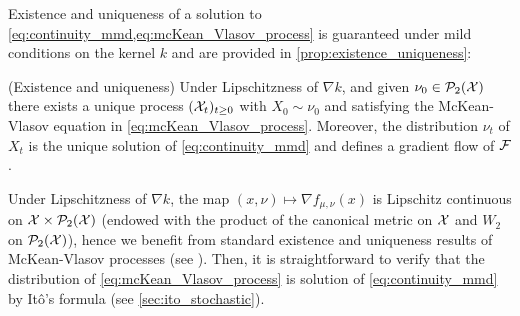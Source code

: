 Existence and uniqueness of a solution to \cref{eq:continuity_mmd,eq:mcKean_Vlasov_process} is guaranteed under mild conditions on the kernel $k$ and are provided in \cref{prop:existence_uniqueness}:
\begin{proposition}\label{prop:existence_uniqueness}(Existence and uniqueness)
	Under Lipschitzness of $\nabla k$, and given $\nu_0\in \mathcal{P}_2({{\mathcal X}})$ there exists a unique process $({{\mathcal X}}_t)_{t\geq 0}$ with $X_0\sim \nu_0$ and satisfying the McKean-Vlasov equation in \cref{eq:mcKean_Vlasov_process}. Moreover, the distribution $\nu_t$ of $X_t$ is the unique solution of \cref{eq:continuity_mmd} and defines a gradient flow of ${{\mathcal F}}$. 
\end{proposition}
Under Lipschitzness of $\nabla k$, the map $(x,\nu)\mapsto \nabla f_{\mu,\nu}(x)$ is Lipschitz continuous on ${{\mathcal X}} \times \mathcal{P}_2({{\mathcal X}})$ (endowed with the product of the canonical metric on ${{\mathcal X}}$ and
$W_2$ on $\mathcal{P}_2({{\mathcal X}})$), hence we benefit from standard existence and uniqueness results of McKean-Vlasov processes (see \cite{Jourdain:2007}). Then, it is straightforward to verify that the distribution of \eqref{eq:mcKean_Vlasov_process} is solution of \eqref{eq:continuity_mmd} by Itô's formula (see \cref{sec:ito_stochastic}).  %
